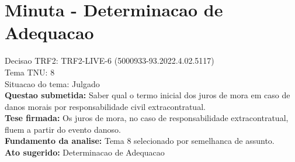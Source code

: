 \documentclass{article}
\begin{document}
\section*{Minuta - Determinacao de Adequacao}
Decisao TRF2: TRF2-LIVE-6 (5000933-93.2022.4.02.5117)\\
Tema TNU: 8\\
Situacao do tema: Julgado\\
\textbf{Questao submetida:} Saber qual o termo inicial dos juros de mora em caso de danos morais por responsabilidade civil extracontratual.\\
\textbf{Tese firmada:} Os juros de mora, no caso de responsabilidade extracontratual, fluem a partir do evento danoso.\\
\textbf{Fundamento da analise:} Tema 8 selecionado por semelhanca de assunto.\\
\textbf{Ato sugerido:} Determinacao de Adequacao
\end{document}
